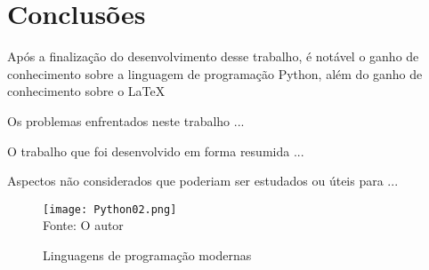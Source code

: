 

\chapter{Conclusões}

Após a finalização do desenvolvimento desse trabalho, é notável o ganho de conhecimento sobre a linguagem de programação Python, além do ganho de conhecimento sobre o LaTeX

Os problemas enfrentados neste trabalho ...


O trabalho que foi desenvolvido em forma resumida ...

Aspectos n\~{a}o considerados que poderiam ser estudados ou \'{u}teis para ...



   \begin{figure}[H]
    \begin{center}
        \caption{Linguagens de programa\c{c}\~{a}o modernas} \label{ling2}
        \texttt{[image: Python02.png]} \\
        {\tiny \sf Fonte: O autor }
    \end{center}
   \end{figure} 